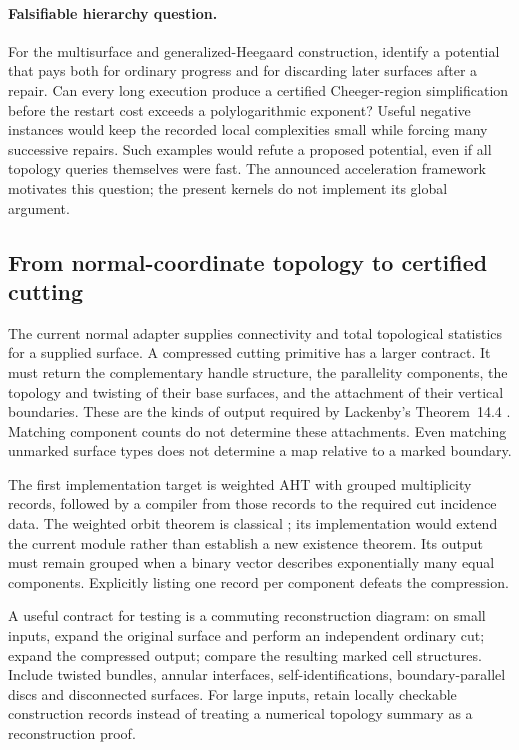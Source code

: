 \paragraph{Falsifiable hierarchy question.}
For the multisurface and generalized-Heegaard construction, identify a
potential that pays both for ordinary progress and for discarding later
surfaces after a repair. Can every long execution produce a certified
Cheeger-region simplification before the restart cost exceeds a
polylogarithmic exponent? Useful negative instances would keep the
recorded local complexities small while forcing many successive repairs.
Such examples would refute a proposed potential, even if all topology
queries themselves were fast. The announced acceleration framework
\cite{lackenbytalk} motivates this question; the present kernels do not
implement its global argument.

\subsection{From normal-coordinate topology to certified cutting}

The current normal adapter supplies connectivity and total topological
statistics for a supplied surface. A compressed cutting primitive has a
larger contract. It must return the complementary handle structure,
the parallelity components, the topology and twisting of their base
surfaces, and the attachment of their vertical boundaries. These are the
kinds of output required by Lackenby's Theorem~14.4
\cite{lackenby2026}. Matching component counts do not determine these
attachments. Even matching unmarked surface types does not determine a
map relative to a marked boundary.

The first implementation target is weighted AHT with grouped multiplicity
records, followed by a compiler from those records to the required cut
incidence data. The weighted orbit theorem is classical \cite{aht}; its
implementation would extend the current module rather than establish a
new existence theorem. Its output must remain grouped when a binary vector
describes exponentially many equal components. Explicitly listing one
record per component defeats the compression.

A useful contract for testing is a commuting reconstruction diagram:
on small inputs, expand the original surface and perform an independent
ordinary cut; expand the compressed output; compare the resulting marked
cell structures. Include twisted bundles, annular interfaces,
self-identifications, boundary-parallel discs and disconnected surfaces.
For large inputs, retain locally checkable construction records instead
of treating a numerical topology summary as a reconstruction proof.

